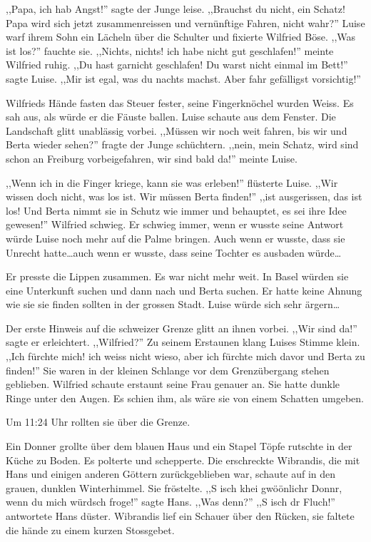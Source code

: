 ,,Papa, ich hab Angst!'' sagte der Junge leise. ,,Brauchst du nicht, ein Schatz! Papa wird sich jetzt zusammenreissen und vernünftige Fahren, nicht wahr?'' Luise warf ihrem Sohn ein Lächeln über die Schulter und fixierte Wilfried Böse. ,,Was ist los?'' fauchte sie. ,,Nichts, nichts! ich habe nicht gut geschlafen!'' meinte Wilfried ruhig. ,,Du hast garnicht geschlafen! Du warst nicht einmal im Bett!'' sagte Luise. ,,Mir ist egal, was du nachts machst. Aber fahr gefälligst vorsichtig!''

Wilfrieds Hände fasten das Steuer fester, seine Fingerknöchel wurden Weiss. Es sah aus, als würde er die Fäuste ballen. Luise schaute aus dem Fenster. Die Landschaft glitt unablässig vorbei. ,,Müssen wir noch weit fahren, bis wir \am und Berta wieder sehen?'' fragte der Junge schüchtern. ,,nein, mein Schatz, wird sind schon an Freiburg vorbeigefahren, wir sind bald da!'' meinte Luise.

,,Wenn ich \am in die Finger kriege, kann sie was erleben!'' flüsterte Luise. ,,Wir wissen doch nicht, was los ist. Wir müssen Berta finden!'' ,,\am ist ausgerissen, das ist los! Und Berta nimmt sie in Schutz wie immer und behauptet, es sei ihre Idee gewesen!'' Wilfried schwieg. Er schwieg immer, wenn er wusste seine Antwort würde Luise noch mehr auf die Palme bringen. Auch wenn er wusste, dass sie Unrecht hatte\dots auch wenn er wusste, dass seine Tochter es ausbaden würde\dots 

Er presste die Lippen zusammen. Es war nicht mehr weit. In Basel würden sie eine Unterkunft suchen und dann nach \am und Berta suchen. Er hatte keine Ahnung wie sie sie finden sollten in der grossen Stadt. Luise würde sich sehr ärgern\dots 

Der erste Hinweis auf die schweizer Grenze glitt an ihnen vorbei. ,,Wir sind da!'' sagte er erleichtert. ,,Wilfried?'' Zu seinem Erstaunen klang Luises Stimme klein. ,,Ich fürchte mich! ich weiss nicht wieso, aber ich fürchte mich davor \am und Berta zu finden!'' Sie waren in der kleinen Schlange vor dem Grenzübergang stehen geblieben. Wilfried schaute erstaunt seine Frau genauer an. Sie hatte dunkle Ringe unter den Augen. Es schien ihm, als wäre sie von einem Schatten umgeben.

Um 11:24 Uhr rollten sie über die Grenze.

\sterne

Ein Donner grollte über dem blauen Haus und ein Stapel Töpfe rutschte in der Küche zu Boden. Es polterte und schepperte. Die erschreckte Wibrandis, die mit Hans und einigen anderen Göttern zurückgeblieben war, schaute auf in den grauen, dunklen Winterhimmel. Sie fröstelte. ,,S isch khei gwöönlichr Donnr, wenn du mich würdsch froge!'' sagte Hans. ,,Was denn?'' ,,S isch dr Fluch!'' antwortete Hans düster. Wibrandis lief ein Schauer über den Rücken, sie faltete die hände zu einem kurzen Stossgebet.

